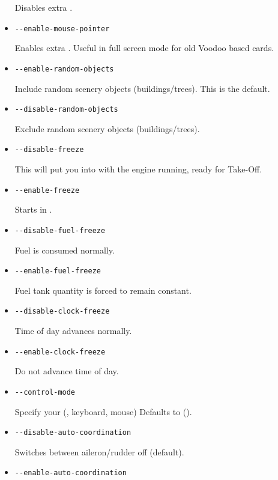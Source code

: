 \begin{itemize}
  Disables extra .

\item{\texttt{-$ $-enable-mouse-pointer}}

  Enables extra . Useful in full screen mode for
  old Voodoo based cards.

\item{\texttt{-$ $-enable-random-objects}}

  Include random scenery objects (buildings/trees). This is the default.

\item{\texttt{-$ $-disable-random-objects}}

  Exclude random scenery objects (buildings/trees).

\item{\texttt{-$ $-disable-freeze}}

  This will put you into \FlightGear{} with the engine running, ready
  for Take-Off.

\item{\texttt{-$ $-enable-freeze}}

  Starts \FlightGear{} in .

\item{\texttt{-$ $-disable-fuel-freeze}}

  Fuel is consumed normally.

\item{\texttt{-$ $-enable-fuel-freeze}}

  Fuel tank quantity is forced to remain constant.

\item{\texttt{-$ $-disable-clock-freeze}}

  Time of day advances normally.

\item{\texttt{-$ $-enable-clock-freeze}}

  Do not advance time of day.

\item{\texttt{-$ $-control-mode}}

  Specify your  (,  keyboard,
  mouse) Defaults to  ().

\item{\texttt{-$ $-disable-auto-coordination}}

  Switches  between aileron/rudder off (default).

\item{\texttt{-$ $-enable-auto-coordination}}


\end{itemize}
